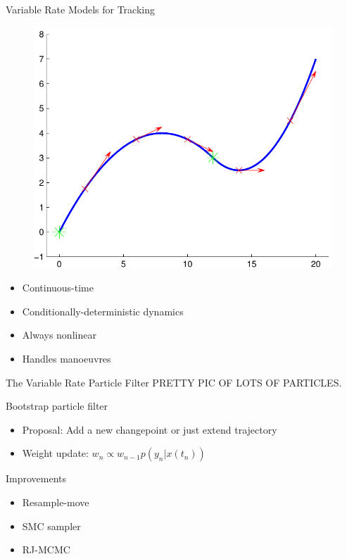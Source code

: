 \documentclass{beamer}
\begin{document}
\begin{frame}{Variable Rate Models for Tracking}
\begin{figure}\centering\includegraphics[scale=0.5]{variable_rate_model.pdf}\end{figure}
\begin{itemize}
  \item Continuous-time
  \item Conditionally-deterministic dynamics
  \item Always nonlinear
  \item Handles manoeuvres
\end{itemize}
\end{frame}

\begin{frame}{The Variable Rate Particle Filter}
PRETTY PIC OF LOTS OF PARTICLES.

Bootstrap particle filter
\begin{itemize}
  \item Proposal: Add a new changepoint or just extend trajectory
  \item Weight update: $w_n \propto w_{n-1} p(y_n|x(t_n))$
\end{itemize}
Improvements
\begin{itemize}
  \item Resample-move
  \item SMC sampler
  \item RJ-MCMC
\end{itemize}
\end{frame}
\end{document}
